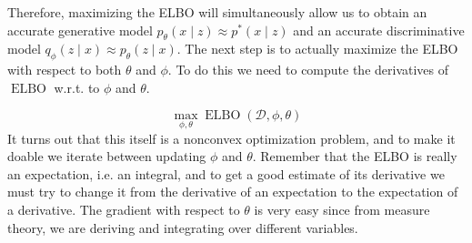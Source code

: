 \documentclass{article}
\DeclareMathOperator{\elbo}{ELBO}
\begin{document}
  Therefore, maximizing the ELBO will simultaneously allow us to obtain an accurate generative model $p_\theta (x \mid z) \approx p^\ast (x \mid z)$ and an accurate discriminative model $q_\phi (z \mid x) \approx p_\theta (z \mid x)$. The next step is to actually maximize the ELBO with respect to both $\theta$ and $\phi$. To do this we need to compute the derivatives of $\elbo$ w.r.t. to $\phi$ and $\theta$. 

  \begin{equation}
    \max_{\phi, \theta} \elbo(\mathcal{D}, \phi, \theta)
  \end{equation}
  It turns out that this itself is a nonconvex optimization problem, and to make it doable we iterate between updating $\phi$ and $\theta$. Remember that the ELBO is really an expectation, i.e. an integral, and to get a good estimate of its derivative we must try to change it from the derivative of an expectation to the expectation of a derivative. The gradient with respect to $\theta$ is very easy since from measure theory, we are deriving and integrating over different variables. 
\end{document}
